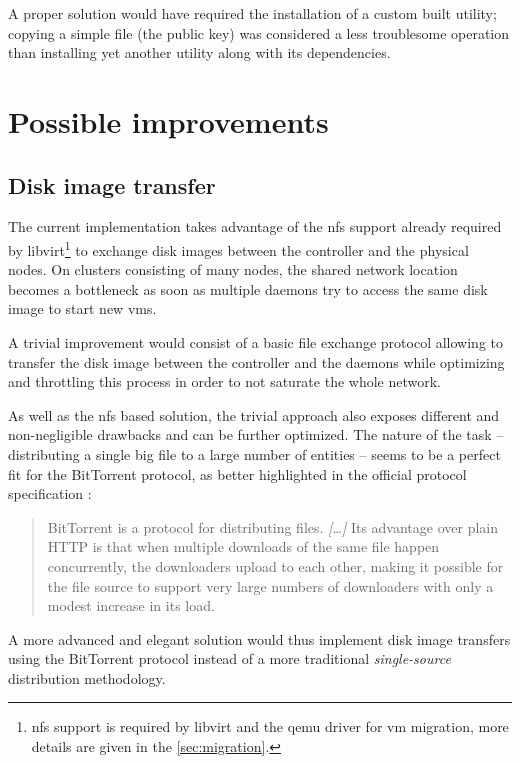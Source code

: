 A proper solution would have required the installation of a custom built utility; copying a simple file (the public key) was considered a less troublesome operation than installing yet another utility along with its dependencies.


\section{Possible improvements}
\label{sec:future-cluster}

\subsection{Disk image transfer}

The current implementation takes advantage of the \gls{nfs} support already required by libvirt\footnote{\gls{nfs} support is required by libvirt and the qemu driver for \gls{vm} migration, more details are given in the \autoref{sec:migration}.} to exchange disk images between the controller and the physical nodes. On clusters consisting of many nodes, the shared network location becomes a bottleneck as soon as multiple daemons try to access the same disk image to start new \glspl{vm}.

A trivial improvement would consist of a basic file exchange protocol allowing to transfer the disk image between the controller and the daemons while optimizing and throttling this process in order to not saturate the whole network.

As well as the \gls{nfs} based solution, the trivial approach also exposes different and non-negligible drawbacks and can be further optimized. The nature of the task -- distributing a single big file to a large number of entities -- seems to be a perfect fit for the BitTorrent protocol, as better highlighted in the official protocol specification \cite{bittorrent-www}:

\begin{quote}
BitTorrent is a protocol for distributing files. \emph{[…]} Its advantage over plain HTTP is that when multiple downloads of the same file happen concurrently, the downloaders upload to each other, making it possible for the file source to support very large numbers of downloaders with only a modest increase in its load.
\end{quote}

A more advanced and elegant solution would thus implement disk image transfers using the BitTorrent protocol instead of a more traditional \emph{single-source} distribution methodology.

